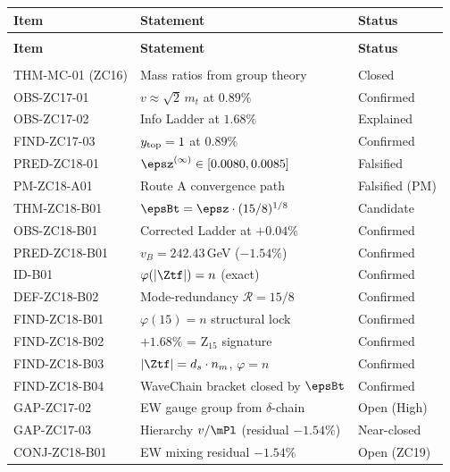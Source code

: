 \documentclass[12pt, a4paper]{article}
\begin{document}
\begin{derivedbox}[title={Z-Programme Status after TASK-ZC18}]
{\small
\setlength{\LTpre}{4pt}
\setlength{\LTpost}{4pt}
\renewcommand{\arraystretch}{1.30}
\begin{longtable}{>{\raggedright\arraybackslash}p{3.6cm}
                  >{\raggedright\arraybackslash}p{5.8cm}
                  >{\centering\arraybackslash}p{2.4cm}}
\toprule
\textbf{Item} & \textbf{Statement} & \textbf{Status} \\
\midrule
\endfirsthead
\multicolumn{3}{l}{\small\textit{(continued)}}\\[4pt]
\toprule
\textbf{Item} & \textbf{Statement} & \textbf{Status} \\
\midrule
\endhead
\midrule
\multicolumn{3}{r}{\small\textit{(continues)}}\\
\endfoot
\bottomrule
\endlastfoot
THM-MC-01 (ZC16)   & Mass ratios from group theory & Closed \\
OBS-ZC17-01        & $v\approx\sqrt{2}\,m_t$ at $0.89\%$ & Confirmed \\
OBS-ZC17-02        & Info Ladder at $1.68\%$ & Explained \\
FIND-ZC17-03       & $y_{\rm top}=1$ at $0.89\%$ & Confirmed \\
\midrule
PRED-ZC18-01       & $\epsz^{(\infty)}\in[0.0080,0.0085]$ & Falsified \\
PM-ZC18-A01        & Route A convergence path & Falsified (PM) \\
\midrule
THM-ZC18-B01       & $\epsBt = \epsz\cdot(15/8)^{1/8}$ & Candidate \\
OBS-ZC18-B01       & Corrected Ladder at $+0.04\%$ & Confirmed \\
PRED-ZC18-B01      & $v_B = 242.43$\,GeV ($-1.54\%$) & Confirmed \\
ID-B01             & $\varphi(|\Ztf|) = n$ (exact) & Confirmed \\
DEF-ZC18-B02       & Mode-redundancy $\mathcal{R}=15/8$ & Confirmed \\
FIND-ZC18-B01      & $\varphi(15)=n$ structural lock & Confirmed \\
FIND-ZC18-B02      & $+1.68\%$ = Z$_{15}$ signature & Confirmed \\
FIND-ZC18-B03      & $|\Ztf|=d_s\cdot n_m$, $\varphi=n$ & Confirmed \\
FIND-ZC18-B04      & WaveChain bracket closed by $\epsBt$ & Confirmed \\
\midrule
GAP-ZC17-02        & EW gauge group from $\delta$-chain & Open (High) \\
GAP-ZC17-03        & Hierarchy $v/\mPl$ (residual $-1.54\%$) & Near-closed \\
CONJ-ZC18-B01      & EW mixing residual $-1.54\%$ & Open (ZC19) \\
\end{longtable}
}
\end{derivedbox}
\end{document}
